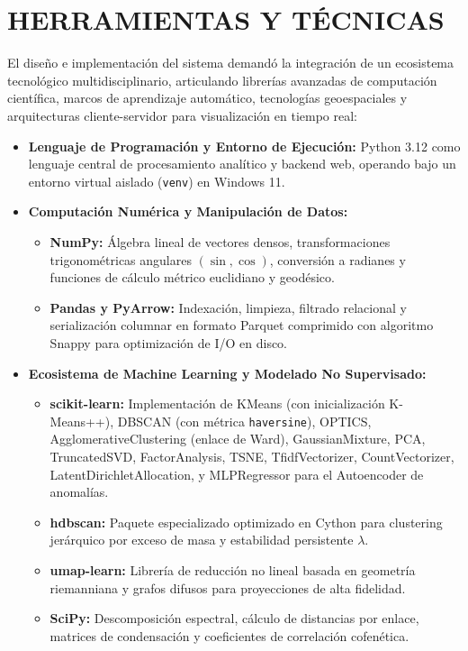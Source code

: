 \section{HERRAMIENTAS Y TÉCNICAS}

El diseño e implementación del sistema demandó la integración de un ecosistema tecnológico multidisciplinario, articulando librerías avanzadas de computación científica, marcos de aprendizaje automático, tecnologías geoespaciales y arquitecturas cliente-servidor para visualización en tiempo real:

\begin{itemize}
    \item \textbf{Lenguaje de Programación y Entorno de Ejecución:} Python 3.12 como lenguaje central de procesamiento analítico y backend web, operando bajo un entorno virtual aislado (\texttt{venv}) en Windows 11.
    \item \textbf{Computación Numérica y Manipulación de Datos:}
    \begin{itemize}
        \item \textbf{NumPy:} Álgebra lineal de vectores densos, transformaciones trigonométricas angulares $(\sin, \cos)$, conversión a radianes y funciones de cálculo métrico euclidiano y geodésico.
        \item \textbf{Pandas y PyArrow:} Indexación, limpieza, filtrado relacional y serialización columnar en formato Parquet comprimido con algoritmo Snappy para optimización de I/O en disco.
    \end{itemize}
    \item \textbf{Ecosistema de Machine Learning y Modelado No Supervisado:}
    \begin{itemize}
        \item \textbf{scikit-learn:} Implementación de KMeans (con inicialización K-Means++), DBSCAN (con métrica \texttt{haversine}), OPTICS, AgglomerativeClustering (enlace de Ward), GaussianMixture, PCA, TruncatedSVD, FactorAnalysis, TSNE, TfidfVectorizer, CountVectorizer, LatentDirichletAllocation, y MLPRegressor para el Autoencoder de anomalías.
        \item \textbf{hdbscan:} Paquete especializado optimizado en Cython para clustering jerárquico por exceso de masa y estabilidad persistente $\lambda$.
        \item \textbf{umap-learn:} Librería de reducción no lineal basada en geometría riemanniana y grafos difusos para proyecciones de alta fidelidad.
        \item \textbf{SciPy:} Descomposición espectral, cálculo de distancias por enlace, matrices de condensación y coeficientes de correlación cofenética.

\end{itemize}
\end{itemize}
